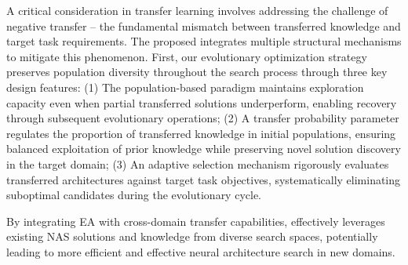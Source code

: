 \documentclass[../main.tex]{subfiles}
\begin{document}
A critical consideration in transfer learning involves addressing the challenge of negative transfer – the fundamental mismatch between transferred knowledge and target task requirements. The proposed \OUR{} integrates multiple structural mechanisms to mitigate this phenomenon. First, our evolutionary optimization strategy preserves population diversity throughout the search process through three key design features: (1) The population-based paradigm maintains exploration capacity even when partial transferred solutions underperform, enabling recovery through subsequent evolutionary operations; (2) A transfer probability parameter regulates the proportion of transferred knowledge in initial populations, ensuring balanced exploitation of prior knowledge while preserving novel solution discovery in the target domain; (3) An adaptive selection mechanism rigorously evaluates transferred architectures against target task objectives, systematically eliminating suboptimal candidates during the evolutionary cycle.

By integrating EA with cross-domain transfer capabilities, \OUR{} effectively leverages existing NAS solutions and knowledge from diverse search spaces, potentially leading to more efficient and effective neural architecture search in new domains.
\end{document}
